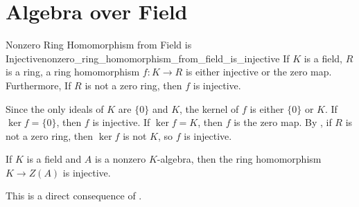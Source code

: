 \section{Algebra over Field}
\begin{lemma}{Nonzero Ring Homomorphism from Field is Injective}{nonzero_ring_homomorphism_from_field_is_injective}
    If $K$ is a field, $R$ is a ring, a ring homomorphism $f:K\to R$ is either injective or the zero map. Furthermore, If $R$ is not a zero ring, then $f$ is injective.
\end{lemma}
\begin{prf}
    Since the only ideals of $K$ are $\{0\}$ and $K$, the kernel of $f$ is either $\{0\}$ or $K$. If $\ker f=\{0\}$, then $f$ is injective. If $\ker f=K$, then $f$ is the zero map. By , if $R$ is not a zero ring, then $\ker f$ is not $K$, so $f$ is injective.
\end{prf}

\begin{corollary}{}{}
    If $K$ is a field and $A$ is a nonzero $K$-algebra, then the ring homomorphism $K\to Z(A)$ is injective.
\end{corollary}
\begin{prf}
    This is a direct consequence of .
\end{prf}


